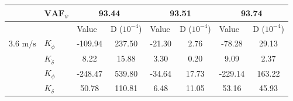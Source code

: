 \begin{table}[]
\begin{tabular}{llcccccc}
                                 & $\mathbf{VAF}_\psi$   & \multicolumn{2}{c}{93.44}                                                                       & \multicolumn{2}{c}{93.51}                                                                       & \multicolumn{2}{c}{93.74}                                                                       \\ \hline
                                 &                       & \multicolumn{1}{l}{\multirow{2}{*}{Value}} & \multicolumn{1}{l}{\multirow{2}{*}{D ($10^{-4}$)}} & \multicolumn{1}{l}{\multirow{2}{*}{Value}} & \multicolumn{1}{l}{\multirow{2}{*}{D ($10^{-4}$)}} & \multicolumn{1}{l}{\multirow{2}{*}{Value}} & \multicolumn{1}{l}{\multirow{2}{*}{D ($10^{-4}$)}} \\
                                 &                       & \multicolumn{1}{l}{}                       & \multicolumn{1}{l}{}                               & \multicolumn{1}{l}{}                       & \multicolumn{1}{l}{}                               & \multicolumn{1}{l}{}                       & \multicolumn{1}{l}{}                               \\ \cline{3-8} 
    3.6 $\si{\meter\per\second}$ & $K_{\dot{\phi}} $     & -109.94                                    & 237.50                                             & -21.30                                     & 2.76                                               & -78.28                                     & 29.13                                              \\
                                 & $K_{\dot{\delta}}$    & 8.22                                       & 15.88                                              & 3.30                                       & 0.20                                               & 9.09                                       & 2.37                                               \\
                                 & $K_{\phi} $           & -248.47                                    & 539.80                                             & -34.64                                     & 17.73                                              & -229.14                                    & 163.22                                             \\
                                 & $K_\delta $           & 50.78                                      & 110.81                                             & 6.48                                       & 11.05                                              & 53.16                                      & 45.93                                              \\

\end{tabular}
\end{table}
